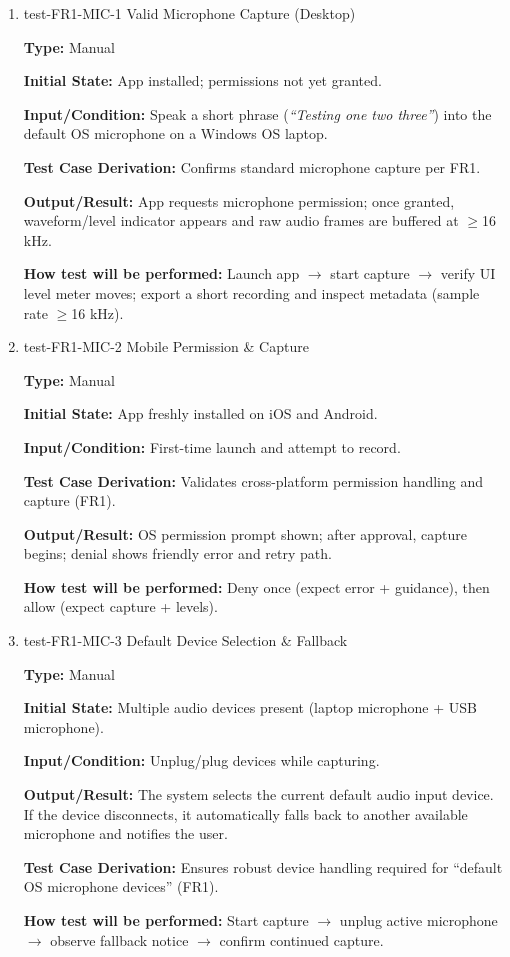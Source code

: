 \documentclass[12pt, titlepage]{article}
\begin{document}
\begin{enumerate}

\item{test-FR1-MIC-1 Valid Microphone Capture (Desktop)\\}

\textbf{Type:} Manual

\textbf{Initial State:} App installed; permissions not yet granted.

\textbf{Input/Condition:} Speak a short phrase (\textit{``Testing one two three''}) into the default OS microphone on a Windows OS laptop.

\textbf{Test Case Derivation:} Confirms standard microphone capture per FR1.

\textbf{Output/Result:} App requests microphone permission; once granted, waveform/level indicator appears and raw audio frames are buffered at $\geq$16 kHz.

\textbf{How test will be performed:} Launch app $\to$ start capture $\to$ verify UI level meter moves; export a short recording and inspect metadata (sample rate $\geq$16 kHz).

\item{test-FR1-MIC-2 Mobile Permission \& Capture\\}

\textbf{Type:} Manual

\textbf{Initial State:} App freshly installed on iOS and Android.

\textbf{Input/Condition:} First-time launch and attempt to record.

\textbf{Test Case Derivation:} Validates cross-platform permission handling and capture (FR1).

\textbf{Output/Result:} OS permission prompt shown; after approval, capture begins; denial shows friendly error and retry path.

\textbf{How test will be performed:} Deny once (expect error + guidance), then allow (expect capture + levels).

\item{test-FR1-MIC-3 Default Device Selection \& Fallback\\}

\textbf{Type:} Manual

\textbf{Initial State:} Multiple audio devices present (laptop microphone + USB microphone).

\textbf{Input/Condition:} Unplug/plug devices while capturing.

\textbf{Output/Result:} The system selects the current default audio input device. If the device disconnects, it automatically falls back to another available microphone and notifies the user.

\textbf{Test Case Derivation:} Ensures robust device handling required for “default OS microphone devices” (FR1).

\textbf{How test will be performed:} Start capture $\to$ unplug active microphone $\to$ observe fallback notice $\to$ confirm continued capture.

\end{enumerate}
\end{document}
